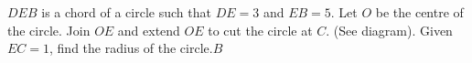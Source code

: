 $DEB$ is a chord of a circle such that $DE=3$ and $EB=5$. Let $O$ be the centre of the circle. Join $OE$ and extend $OE$ to cut the circle at $C$. (See diagram). Given $EC=1$,  find the radius of the circle.$B$